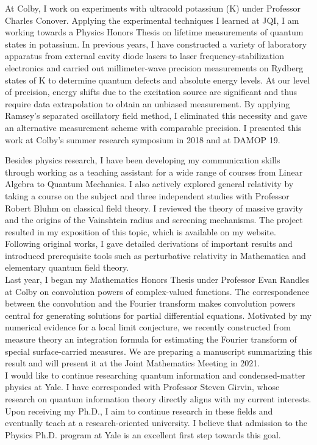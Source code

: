 \documentclass[12pt]{article}
\begin{document}
At Colby, I work on experiments with ultracold potassium (K) under Professor Charles Conover. Applying the experimental techniques I learned at JQI, I am working towards a Physics Honors Thesis on lifetime measurements of quantum states in potassium. In previous years, I have constructed a variety of laboratory apparatus from external cavity diode lasers to laser frequency-stabilization electronics and carried out millimeter-wave precision measurements on Rydberg states of K to determine quantum defects and absolute energy levels. At our level of precision, energy shifts due to the excitation source are significant and thus require data extrapolation to obtain an unbiased measurement. By applying Ramsey's separated oscillatory field method, I eliminated this necessity and gave an alternative measurement scheme with comparable precision. I presented this work at Colby's summer research symposium in 2018 and at DAMOP 19.  

Besides physics research, I have been developing my communication skills through working as a teaching assistant for a wide range of courses from Linear Algebra to Quantum Mechanics. I also actively explored general relativity by taking a course on the subject and three independent studies with Professor Robert Bluhm on classical field theory. I reviewed the theory of massive gravity and the origins of the Vainshtein radius and screening mechanisms. The project resulted in my exposition of this topic, which is available on my website. Following original works, I gave detailed derivations of important results and introduced prerequisite tools such as perturbative relativity in Mathematica and elementary quantum field theory. \\ 

Last year, I began my Mathematics Honors Thesis under Professor Evan Randles at Colby on convolution powers of complex-valued functions. The correspondence between the convolution and the Fourier transform makes convolution powers central for generating solutions for partial differential equations. Motivated by my numerical evidence for a local limit conjecture, we recently constructed from measure theory an integration formula for estimating the Fourier transform of special surface-carried measures. We are preparing a manuscript summarizing this result and will present it at the Joint Mathematics Meeting in 2021. \\ 

I would like to continue researching quantum information and condensed-matter physics at Yale. I have corresponded with Professor Steven Girvin, whose research on quantum information theory directly aligns with my current interests. Upon receiving my Ph.D., I aim to continue research in these fields and eventually teach at a research-oriented university. I believe that admission to the Physics Ph.D. program at Yale is an excellent first step towards this goal.  

	

















	
	
	
	
	
\end{document}
